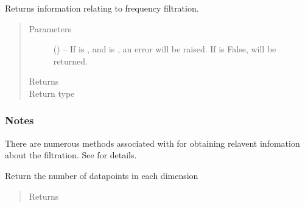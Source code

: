 \documentclass[letterpaper,10pt,english]{sphinxmanual}
\begin{document}
\begin{fulllineitems}
\begin{fulllineitems}
\label{\detokenize{references/core:nmrespy.core.Estimator.get_filter_info}}
\sphinxAtStartPar
Returns information relating to frequency filtration.
\begin{quote}\begin{description}
\item[{Parameters}] \leavevmode
\sphinxAtStartPar
{} (\sphinxstyleliteralemphasis{\sphinxupquote{, }}) – If  is , and  is , an error will
be raised. If  is False,  will be returned.

\item[{Returns}] \leavevmode
\sphinxAtStartPar
{}

\item[{Return type}] \leavevmode
\sphinxAtStartPar
{\hyperref[\detokenize{references/freqfilter:nmrespy.freqfilter.FrequencyFilter}]{}}

\end{description}\end{quote}
\subsubsection*{Notes}

\sphinxAtStartPar
There are numerous methods associated with  for
obtaining relavent infomation about the filtration. See
{\hyperref[\detokenize{references/freqfilter:nmrespy.freqfilter.FrequencyFilter}]{}} for details.

\end{fulllineitems}


\begin{fulllineitems}
\label{\detokenize{references/core:nmrespy.core.Estimator.get_n}}
\sphinxAtStartPar
Return the number of datapoints in each dimension
\begin{quote}\begin{description}
\item[{Returns}] \leavevmode
\sphinxAtStartPar
{}


\end{description}
\end{quote}
\end{fulllineitems}
\end{fulllineitems}
\end{document}

